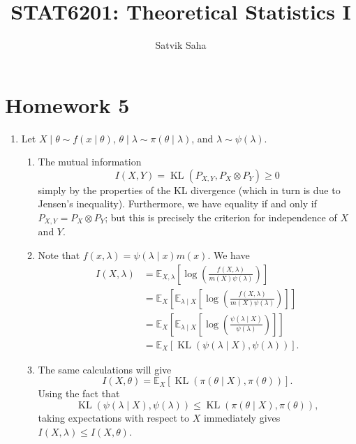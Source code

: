 \documentclass[11pt]{article}
\title{\bfseries STAT6201: Theoretical Statistics I}
\author{Satvik Saha}
\date{}
\newcommand{\EE}{\mathbb{E}}
\DeclareMathOperator*{\KL}{KL}
\begin{document}
    \maketitle

    \section*{Homework 5}

    \begin{enumerate}

        \item Let $X\mid \theta \sim f(x\mid \theta)$, $\theta\mid \lambda \sim
        \pi(\theta\mid \lambda)$, and $\lambda \sim \psi(\lambda)$.

        \begin{enumerate}
            \item The mutual information \[
                I(X, Y) = \KL(P_{X, Y}, P_X\otimes P_Y) \geq 0
            \] simply by the properties of the KL divergence (which in turn is
            due to Jensen's inequality).
            Furthermore, we have equality if and only if $P_{X, Y} = P_X\otimes
            P_Y$; but this is precisely the criterion for independence of $X$
            and $Y$.

            \item Note that $f(x, \lambda) = \psi(\lambda\mid x) m(x)$.
            We have \begin{align*}
                I(X, \lambda)
                    &= \EE_{X, \lambda}\left[\log\left(\frac{f(X, \lambda)}{m(X) \psi(\lambda)}\right)\right] \\
                    &= \EE_{X}\left[\EE_{\lambda \mid X}\left[\log\left(\frac{f(X, \lambda)}{m(X) \psi(\lambda)}\right)\right]\right] \\
                    &= \EE_{X}\left[\EE_{\lambda \mid X}\left[\log\left(\frac{\psi(\lambda\mid X)}{\psi(\lambda)}\right)\right]\right] \\
                    &= \EE_{X}\left[\KL(\psi(\lambda\mid X), \psi(\lambda))\right].
            \end{align*}

            \item The same calculations will give \[
                I(X, \theta) = \EE_X\left[\KL(\pi(\theta\mid X), \pi(\theta))\right].
            \] Using the fact that \[
                \KL(\psi(\lambda\mid X), \psi(\lambda)) \leq \KL(\pi(\theta\mid X), \pi(\theta)),
            \] taking expectations with respect to $X$ immediately gives $I(X,
            \lambda) \leq I(X, \theta)$.
        \end{enumerate}



\end{enumerate}
\end{document}
